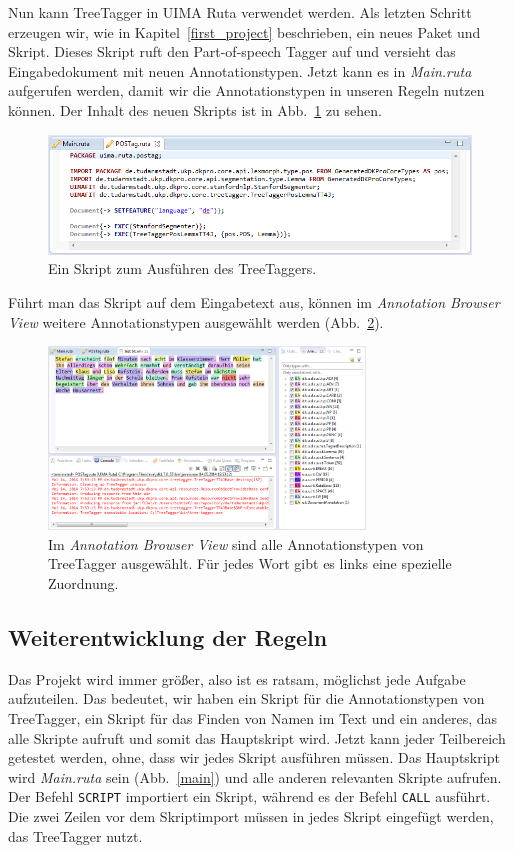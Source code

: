 \documentclass{article}
\begin{document}
Nun kann TreeTagger in UIMA Ruta verwendet werden. Als letzten Schritt erzeugen wir, wie in Kapitel~\ref{first_project} beschrieben, ein neues Paket und Skript. Dieses Skript ruft den Part-of-speech Tagger auf und versieht das Eingabedokument mit neuen Annotationstypen. Jetzt kann es in \textit{Main.ruta} aufgerufen werden, damit wir die Annotationstypen in unseren Regeln nutzen können. Der Inhalt des neuen Skripts ist in Abb.~\ref{pos} zu sehen.

\begin{figure}
\centering
\includegraphics[width=1\textwidth]{figs/tt_pos.png}
\caption{Ein Skript zum Ausführen des TreeTaggers.}
\label{pos}
\end{figure}

Führt man das Skript auf dem Eingabetext aus, können im \textit{Annotation Browser View} weitere Annotationstypen ausgewählt werden (Abb.~\ref{pos2}).

\begin{figure}
\centering
\includegraphics[width=0.75\textwidth]{figs/tt_pos2.png}
\caption{Im \textit{Annotation Browser View} sind alle Annotationstypen von TreeTagger ausgewählt. Für jedes Wort gibt es links eine spezielle Zuordnung.}
\label{pos2}
\end{figure}

\subsection{Weiterentwicklung der Regeln}
Das Projekt wird immer größer, also ist es ratsam, möglichst jede Aufgabe aufzuteilen. Das bedeutet, wir haben ein Skript für die Annotationstypen von TreeTagger, ein Skript für das Finden von Namen im Text und ein anderes, das alle Skripte aufruft und somit das Hauptskript wird. Jetzt kann jeder Teilbereich getestet werden, ohne, dass wir jedes Skript ausführen müssen. Das Hauptskript wird \textit{Main.ruta} sein (Abb.~\ref{main}) und alle anderen relevanten Skripte aufrufen. Der Befehl \texttt{SCRIPT} importiert ein Skript, während es der Befehl \texttt{CALL} ausführt. Die zwei Zeilen vor dem Skriptimport müssen in jedes Skript eingefügt werden, das TreeTagger nutzt.
\end{document}
